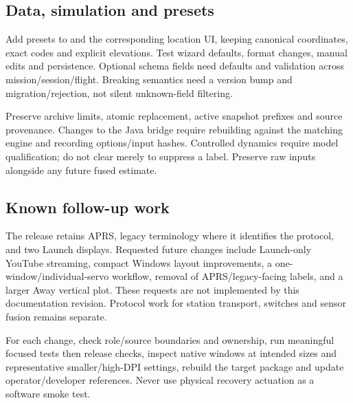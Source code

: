 \subsection{Data, simulation and presets}
Add presets to  and the corresponding location UI, keeping
canonical coordinates, exact codes and explicit elevations. Test wizard defaults,
format changes, manual edits and persistence. Optional schema fields need defaults
and validation across mission/session/flight. Breaking semantics need a version
bump and migration/rejection, not silent unknown-field filtering.

Preserve archive limits, atomic replacement, active snapshot prefixes and
source provenance. Changes to the Java bridge require rebuilding against the
matching engine and recording options/input hashes. Controlled dynamics require
model qualification; do not clear  merely
to suppress a label. Preserve raw inputs alongside any future fused estimate.

\subsection{Known follow-up work}
The release retains APRS, legacy terminology where it identifies the protocol,
and two Launch displays. Requested future changes include Launch-only YouTube
streaming, compact Windows layout improvements, a one-window/individual-servo
workflow, removal of APRS/legacy-facing labels, and a larger Away vertical plot.
These requests are not implemented by this documentation revision. Protocol
work for station transport, switches and sensor fusion remains separate.

For each change, check role/source boundaries and ownership, run meaningful
focused tests then release checks, inspect native windows at intended sizes
and representative smaller/high-DPI settings, rebuild the target package and
update operator/developer references. Never use physical recovery actuation
as a software smoke test.
